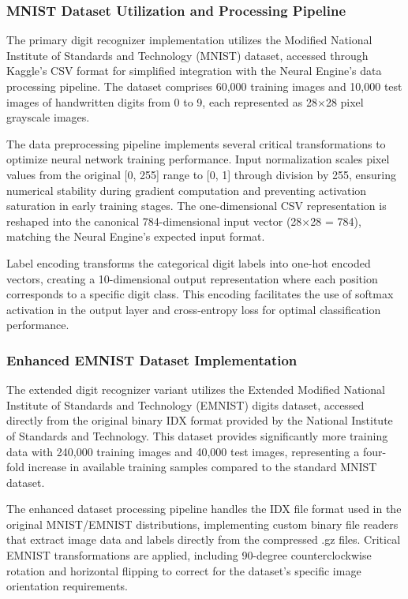 \documentclass[11pt,a4paper]{report}
\begin{document}
\subsubsection{MNIST Dataset Utilization and Processing Pipeline}

The primary digit recognizer implementation utilizes the Modified National Institute of Standards and Technology (MNIST) dataset, accessed through Kaggle's CSV format for simplified integration with the Neural Engine's data processing pipeline. The dataset comprises 60,000 training images and 10,000 test images of handwritten digits from 0 to 9, each represented as 28×28 pixel grayscale images.

The data preprocessing pipeline implements several critical transformations to optimize neural network training performance. Input normalization scales pixel values from the original [0, 255] range to [0, 1] through division by 255, ensuring numerical stability during gradient computation and preventing activation saturation in early training stages. The one-dimensional CSV representation is reshaped into the canonical 784-dimensional input vector (28×28 = 784), matching the Neural Engine's expected input format.

Label encoding transforms the categorical digit labels into one-hot encoded vectors, creating a 10-dimensional output representation where each position corresponds to a specific digit class. This encoding facilitates the use of softmax activation in the output layer and cross-entropy loss for optimal classification performance.

\subsubsection{Enhanced EMNIST Dataset Implementation}

The extended digit recognizer variant utilizes the Extended Modified National Institute of Standards and Technology (EMNIST) digits dataset, accessed directly from the original binary IDX format provided by the National Institute of Standards and Technology. This dataset provides significantly more training data with 240,000 training images and 40,000 test images, representing a four-fold increase in available training samples compared to the standard MNIST dataset.

The enhanced dataset processing pipeline handles the IDX file format used in the original MNIST/EMNIST distributions, implementing custom binary file readers that extract image data and labels directly from the compressed .gz files. Critical EMNIST transformations are applied, including 90-degree counterclockwise rotation and horizontal flipping to correct for the dataset's specific image orientation requirements.
\end{document}

